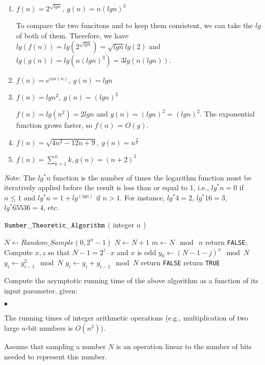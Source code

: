 \documentclass{article}
\newenvironment{myitem}{\begin{list}{$\bullet$}
{\setlength{\itemsep}{-0pt}
\setlength{\topsep}{0pt}
\setlength{\labelwidth}{0pt}
\setlength{\leftmargin}{10pt}
\setlength{\parsep}{-0pt}
\setlength{\itemsep}{0pt}
\setlength{\partopsep}{0pt}}}%
{\end{list}}
\begin{document}
\begin{enumerate}
\item $f(n) = 2^{\sqrt{lgn}},\ g(n) = n(lgn)^3$

To compare the two funcitons and to keep them consistent, we can take the $lg$ of both of them. Therefore, we have $lg(f(n))=lg(2^{\sqrt{lgn}})=\sqrt{lgn}lg(2)$ and $lg(g(n))=lg(n(lgn)^3)=3lg(n(lgn))$. 

\item $f(n) = e^{cos(n)},\ g(n) = lgn$

\item $f(n) = lgn^2,\ g(n) = (lgn)^2$

$f(n)=lg(n^2)=2lgn$ and $g(n)=(lgn)^2=(lgn)^2$. The exponential function grows faster, so $f(n)$ = $O(g)$.

\item $f(n) = \sqrt{4n^2 - 12n + 9},\ g(n) = n^{\frac{3}{2}}$
\item $f(n) = \sum_{k=1}^{n} k, g(n) = (n+2)^2$
\end{enumerate}

{\emph Note:} The $lg^*n$ function is the number of times the
logarithm function must be iteratively applied before the result is
less than or equal to 1, i.e., $lg^*n = 0$ if $n \leq 1$ and $lg^*n =
1 + lg^(lgn)$ if $n > 1$. For instance, $lg^*4=2$, $lg^*16=3$,
$lg^*65536=4$, etc.


\begin{algorithm}[h]
\caption{${\tt Number\_Theoretic\_Algorithm}$ $($ integer $n$ ) }
\label{algo}
$N \leftarrow Random\_Sample( 0, 2^n-1)$\;
{
  $N \leftarrow N + 1$\;
}
$m \leftarrow N \mod\ n$\;
{
  {
    return {\tt FALSE};
  }
  Compute $x,z$ so that $N - 1 = 2^z \cdot x$ and $x$ is odd\;
  $y_0 \leftarrow (N-1-j)^x \mod N$\;
  {
    $y_i \leftarrow y_{i-1}^2 \mod N$\;
    $y_i \leftarrow y_i + y_{i-1} \mod N$\;
  }
  {
    return {\tt FALSE}\;
  }
}
return {\tt TRUE}\;
\end{algorithm}

 Compute the asymptotic running time of the
above algorithm as a function of its input parameter, given:

\begin{myitem}
\item The running times of integer arithmetic operations (e.g.,
  multiplication of two large $n$-bit numbers is $O(n^2)$).
\item Assume that sampling a number $N$ is an operation linear to the
  number of bits needed to represent this number.
\end{myitem}
\end{document}
